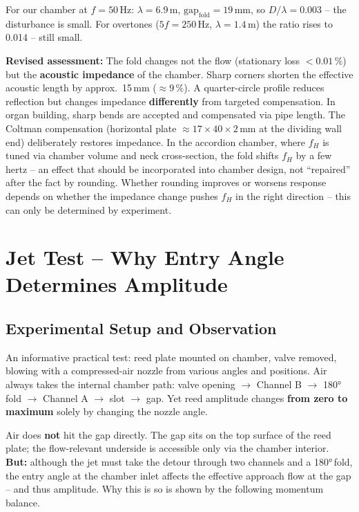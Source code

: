 \documentclass[11pt,a4paper]{article}
\begin{document}
For our chamber at $f = 50$\,Hz: $\lambda = 6.9$\,m, $\text{gap}_\text{fold} = 19$\,mm, so $D/\lambda = 0.003$ -- the disturbance is small. For overtones ($5f = 250$\,Hz, $\lambda = 1.4$\,m) the ratio rises to 0.014 -- still small.

\begin{keybox}
\textbf{Revised assessment:} The fold changes not the flow (stationary loss $< 0.01\,\%$) but the \textbf{acoustic impedance} of the chamber. Sharp corners shorten the effective acoustic length by approx.\ 15\,mm ($\approx 9\,\%$). A quarter-circle profile reduces reflection but changes impedance \textbf{differently} from targeted compensation. In organ building, sharp bends are accepted and compensated via pipe length. The Coltman compensation (horizontal plate $\approx 17 \times 40 \times 2$\,mm at the dividing wall end) deliberately restores impedance. In the accordion chamber, where $f_H$ is tuned via chamber volume and neck cross-section, the fold shifts $f_H$ by a few hertz -- an effect that should be incorporated into chamber design, not ``repaired'' after the fact by rounding. Whether rounding improves or worsens response depends on whether the impedance change pushes $f_H$ in the right direction -- this can only be determined by experiment.
\end{keybox}

\section[Jet Test]{Jet Test -- Why Entry Angle Determines Amplitude}

\subsection{Experimental Setup and Observation}

An informative practical test: reed plate mounted on chamber, valve removed, blowing with a compressed-air nozzle from various angles and positions. Air always takes the internal chamber path: valve opening $\rightarrow$ Channel B $\rightarrow$ 180°\,fold $\rightarrow$ Channel A $\rightarrow$ slot $\rightarrow$ gap. Yet reed amplitude changes \textbf{from zero to maximum} solely by changing the nozzle angle.

\begin{warnbox}
Air does \textbf{not} hit the gap directly. The gap sits on the top surface of the reed plate; the flow-relevant underside is accessible only via the chamber interior. \textbf{But:} although the jet must take the detour through two channels and a 180°\,fold, the entry angle at the chamber inlet affects the effective approach flow at the gap -- and thus amplitude. Why this is so is shown by the following momentum balance.
\end{warnbox}
\end{document}
